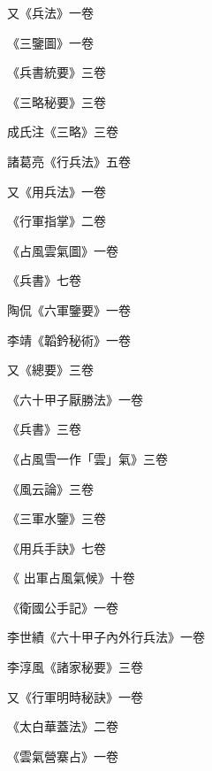 \begin{pinyinscope}
 又《兵法》一卷



 《三鑒圖》一卷



 《兵書統要》三卷



 《三略秘要》三卷



 成氏注《三略》三卷



 諸葛亮《行兵法》五卷



 又《用兵法》一卷



 《行軍指掌》二卷



 《占風雲氣圖》一卷



 《兵書》七卷



 陶侃《六軍鑒要》一卷



 李靖《韜鈐秘術》一卷



 又《總要》三卷



 《六十甲子厭勝法》一卷



 《兵書》三卷



 《占風雪一作「雲」氣》三卷



 《風云論》三卷



 《三軍水鑒》三卷



 《用兵手訣》七卷



 《
 出軍占風氣候》十卷



 《衛國公手記》一卷



 李世績《六十甲子內外行兵法》一卷



 李淳風《諸家秘要》三卷



 又《行軍明時秘訣》一卷



 《太白華蓋法》二卷



 《雲氣營寨占》一卷




\end{pinyinscope}
